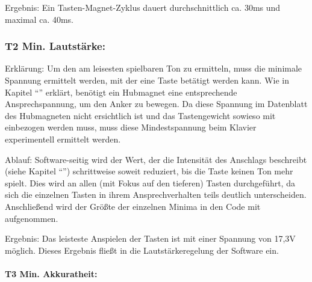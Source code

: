 Ergebnis: Ein Tasten-Magnet-Zyklus dauert durchschnittlich ca. 30ms und maximal ca. 40ms.

\subsubsection{T2 Min. Lautstärke:}

Erklärung: Um den am leisesten spielbaren Ton zu ermitteln, muss die minimale Spannung ermittelt werden, mit der eine Taste betätigt werden kann.
Wie in Kapitel \enquote{} erklärt, benötigt ein Hubmagnet eine entsprechende Ansprechspannung, um den Anker zu bewegen.
Da diese Spannung im Datenblatt des Hubmagneten nicht ersichtlich ist und das Tastengewicht sowieso mit einbezogen werden muss, muss diese Mindestspannung beim Klavier experimentell ermittelt werden.

Ablauf: Software-seitig wird der Wert, der die Intensität des Anschlags beschreibt (siehe Kapitel \enquote{}) schrittweise soweit reduziert, bis die Taste keinen Ton mehr spielt.
Dies wird an allen (mit Fokus auf den tieferen) Tasten durchgeführt, da sich die einzelnen Tasten in ihrem Ansprechverhalten teils deutlich unterscheiden. %
Anschließend wird der Größte der einzelnen Minima in den Code mit aufgenommen.

Ergebnis: Das leisteste Anspielen der Tasten ist mit einer Spannung von 17,3V möglich.
Dieses Ergebnis fließt in die Lautstärkeregelung der Software ein.


\paragraph{T3 Min. Akkuratheit:}
